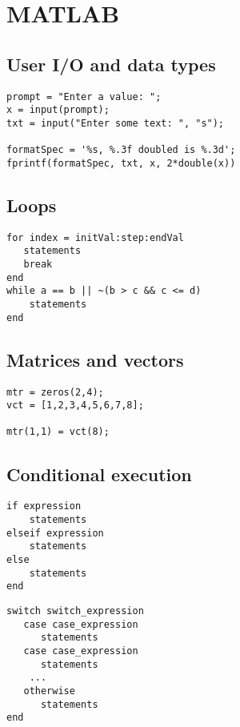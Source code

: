 \documentclass{article}
\begin{document}
\section{MATLAB}

\subsection{User I/O and data types}
\begin{lstlisting}[style=Matlab-editor]
prompt = "Enter a value: ";
x = input(prompt);
txt = input("Enter some text: ", "s");

formatSpec = '%s, %.3f doubled is %.3d';
fprintf(formatSpec, txt, x, 2*double(x))
\end{lstlisting}

\subsection{Loops}
\begin{lstlisting}[style=Matlab-editor]
for index = initVal:step:endVal
   statements
   break
end
while a == b || ~(b > c && c <= d)
    statements
end
\end{lstlisting}

\subsection{Matrices and vectors}
\begin{lstlisting}[style=Matlab-editor]
mtr = zeros(2,4);
vct = [1,2,3,4,5,6,7,8];

mtr(1,1) = vct(8);
\end{lstlisting}

\subsection{Conditional execution}
\begin{multicols}{2}
\begin{lstlisting}[style=Matlab-editor]
if expression
    statements
elseif expression
    statements
else
    statements
end
\end{lstlisting}\columnbreak
\begin{lstlisting}[style=Matlab-editor]
switch switch_expression
   case case_expression
      statements
   case case_expression
      statements
    ...
   otherwise
      statements
end
\end{lstlisting}
\end{multicols}
\end{document}
